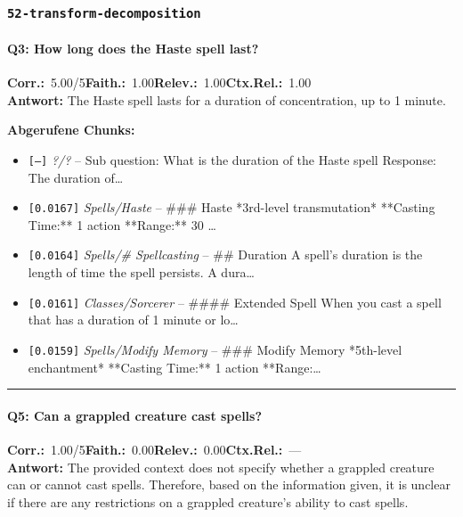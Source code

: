 \subsubsection*{\texttt{52-transform-decomposition}}
\label{app:samples:52_transform_decomposition}

\paragraph{Q3: How long does the Haste spell last?}
\noindent \textbf{Corr.:}~5.00/5\quad \textbf{Faith.:}~1.00\quad \textbf{Relev.:}~1.00\quad \textbf{Ctx.Rel.:}~1.00\\

\noindent\textbf{Antwort:} The Haste spell lasts for a duration of concentration, up to 1 minute.

\noindent\textbf{Abgerufene Chunks:}
\begin{itemize}[noitemsep, topsep=2pt]
  \item[\textbf{\#1}] \texttt{[—]} \textit{?/?} -- Sub question: What is the duration of the Haste spell Response:  The duration of\ldots
  \item[\textbf{\#2}] \texttt{[0.0167]} \textit{Spells/Haste} -- \#\#\# Haste  *3rd-level transmutation*  **Casting Time:** 1 action  **Range:** 30 \ldots
  \item[\textbf{\#3}] \texttt{[0.0164]} \textit{Spells/# Spellcasting} -- \#\# Duration  A spell's duration is the length of time the spell persists. A dura\ldots
  \item[\textbf{\#4}] \texttt{[0.0161]} \textit{Classes/Sorcerer} -- \#\#\#\# Extended Spell  When you cast a spell that has a duration of 1 minute or lo\ldots
  \item[\textbf{\#5}] \texttt{[0.0159]} \textit{Spells/Modify Memory} -- \#\#\# Modify Memory  *5th-level enchantment*  **Casting Time:** 1 action  **Range:\ldots
\end{itemize}
\vspace{4pt}
\hrule
\vspace{6pt}

\paragraph{Q5: Can a grappled creature cast spells?}
\noindent \textbf{Corr.:}~1.00/5\quad \textbf{Faith.:}~0.00\quad \textbf{Relev.:}~0.00\quad \textbf{Ctx.Rel.:}~—\\

\noindent\textbf{Antwort:} The provided context does not specify whether a grappled creature can or cannot cast spells. Therefore, based on the information given, it is unclear if there are any restrictions on a grappled creature's ability to cast spells.


